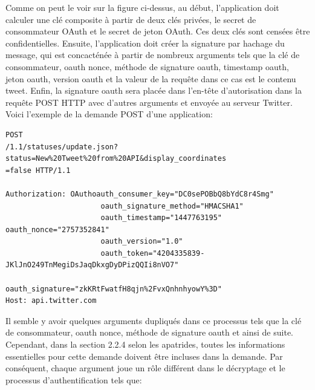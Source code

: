Comme on peut le voir sur la figure ci-dessus, au début, l'application doit calculer une clé composite à partir de deux clés privées, le secret de consommateur OAuth et le secret de jeton OAuth. Ces deux clés sont censées être confidentielles. Ensuite, l'application doit créer la signature par hachage du message, qui est concacténée à partir de nombreux arguments tels que la clé de consommateur, oauth nonce, méthode de signature oauth, timestamp oauth, jeton oauth, version oauth et la valeur de la requête dans ce cas est le contenu tweet. Enfin, la signature oauth sera placée dans l'en-tête d'autorisation dans la requête POST HTTP avec d'autres arguments et envoyée au serveur Twitter. Voici l'exemple de la demande POST d'une application:


\begin{verbatim}
POST 
/1.1/statuses/update.json?status=New%20Tweet%20from%20API&display_coordinates
=false HTTP/1.1

Authorization: OAuthoauth_consumer_key="DC0sePOBbQ8bYdC8r4Smg" 
                      oauth_signature_method="HMACSHA1"
                      oauth_timestamp="1447763195" oauth_nonce="2757352841" 
                      oauth_version="1.0" 
                      oauth_token="4204335839-
JKlJnO249TnMegiDsJaqDkxgDyDPizQQIi8nVO7" 
                      oauth_signature="zkKRtFwatfH8qjn%2FvxQnhnhyowY%3D"
Host: api.twitter.com
\end{verbatim}


Il semble y avoir quelques arguments dupliqués dans ce processus tels que la clé de consommateur, oauth nonce, méthode de signature oauth et ainsi de suite. Cependant, dans la section 2.2.4 selon les apatrides, toutes les informations essentielles pour cette demande doivent être incluses dans la demande. Par conséquent, chaque argument joue un rôle différent dans le décryptage et le processus d'authentification tels que:


